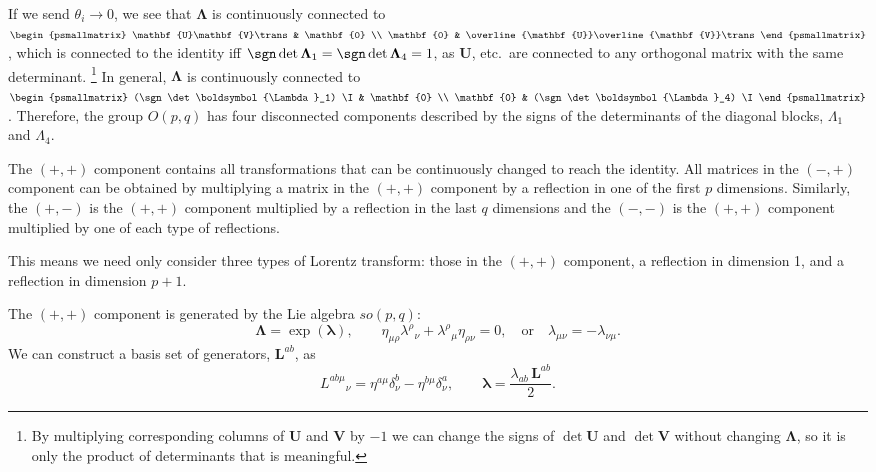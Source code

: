 \documentclass[11pt]{article}
\newcommand{\U}{\mathbf{U}}
\newcommand{\V}{\mathbf{V}}
\newcommand{\Ub}{\overline{\U}}
\newcommand{\Vb}{\overline{\V}}
\newcommand{\lambdab}{\boldsymbol{\lambda}}
\newcommand{\Lambdab}{\boldsymbol{\Lambda}}
\begin{document}
If we send \(\theta_i \to 0\), we see that \(\Lambdab\) is continuously connected to
\(
\begin{psmallmatrix}
  \U\V\trans & \mathbf{0} \\
  \mathbf{0} & \Ub\Vb\trans
\end{psmallmatrix}
\),
which is connected to the identity iff \(\sgn \det \Lambdab_1 = \sgn \det \Lambdab_4 = 1\), 
as \(\U\), etc.\ are connected to any orthogonal matrix with the same determinant.%
\footnote{By multiplying corresponding columns of \(\U\) and \(\V\) by \(-1\) we can change the signs of \(\det\U\) and \(\det\V\) without changing \(\Lambdab\), so it is only the product of determinants that is meaningful.}
In general, \(\Lambdab\) is continuously connected to
\(
\begin{psmallmatrix}
  (\sgn \det \Lambdab_1) \I & \mathbf{0} \\
  \mathbf{0} & (\sgn \det \Lambdab_4) \I
\end{psmallmatrix}
\).
Therefore, the group \(O(p,q)\) has four disconnected components described by the signs of the determinants of the diagonal blocks, \(\Lambda_1\) and  \(\Lambda_4\).

The \((+,+)\) component contains all transformations that can be continuously changed to reach the identity.
All matrices in the \((-,+)\) component can be obtained by multiplying a matrix in the \((+,+)\) component by a reflection in one of the first \(p\) dimensions.
Similarly, the \((+,-)\) is the \((+,+)\) component multiplied by a reflection in the last \(q\) dimensions and the \((-,-)\) is the \((+,+)\) component multiplied by one of each type of reflections.

This means we need only consider three types of Lorentz transform: those in the \((+,+)\) component, a reflection in dimension 1, and a reflection in dimension \(p+1\).

The \((+,+)\) component is generated by the Lie algebra \(so(p,q)\):
%
\begin{equation}\label{eq:lielorentz}
  \Lambdab = \exp(\lambdab),
  \qquad
  \eta_{\mu\rho} \lambda^\rho{}_\nu +  \lambda^\rho{}_\mu \eta_{\rho\nu} = 0,
  \quad \text{or} \quad
  \lambda_{\mu\nu} = - \lambda_{\nu\mu}.
\end{equation}
%
We can construct a basis set of generators, \(\mathbf{L}^{ab}\), as
%
\begin{equation}\label{eq:genlorentz}
  L^{ab\mu}{}_\nu = \eta^{a\mu} \delta^b_\nu - \eta^{b\mu} \delta_\nu^a,
  \qquad
  \lambdab = \frac{\lambda_{ab}\, \mathbf{L}^{ab}}{2}.
\end{equation}
%
\end{document}
